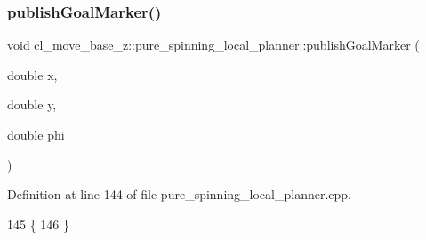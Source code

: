 \subsubsection{\texorpdfstring{publish\+Goal\+Marker()}{publishGoalMarker()}}
{\footnotesize\ttfamily void cl\+\_\+move\+\_\+base\+\_\+z\+::pure\+\_\+spinning\+\_\+local\+\_\+planner\+::publish\+Goal\+Marker (\begin{DoxyParamCaption}\item[{double}]{x,  }\item[{double}]{y,  }\item[{double}]{phi }\end{DoxyParamCaption})}



Definition at line 144 of file pure\+\_\+spinning\+\_\+local\+\_\+planner.\+cpp.


\begin{DoxyCode}
145 \{
146 \}
\end{DoxyCode}
